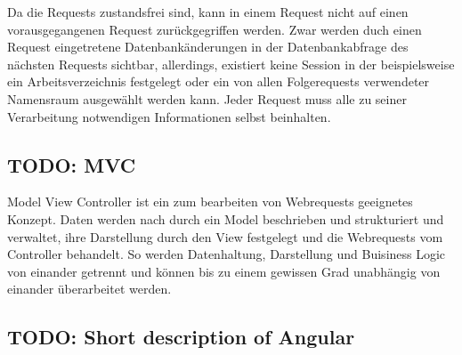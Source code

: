 Da die Requests zustandsfrei sind, kann in einem Request nicht auf
einen vorausgegangenen Request zurückgegriffen werden. Zwar werden
duch einen Request eingetretene Datenbankänderungen in der
Datenbankabfrage des nächsten Requests sichtbar, allerdings, existiert
keine Session in der beispielsweise ein Arbeitsverzeichnis festgelegt
oder ein von allen Folgerequests verwendeter Namensraum ausgewählt
werden kann. Jeder Request muss alle zu seiner Verarbeitung
notwendigen Informationen selbst beinhalten.

\subsection{TODO: MVC} Model View Controller ist ein zum bearbeiten
von Webrequests geeignetes Konzept.  Daten werden nach durch ein Model
beschrieben und strukturiert und verwaltet, ihre Darstellung durch den
View festgelegt und die Webrequests vom Controller behandelt. So
werden Datenhaltung, Darstellung und Buisiness Logic von einander
getrennt und können bis zu einem gewissen Grad unabhängig von einander
überarbeitet werden.

\subsection{TODO: Short description of Angular}


